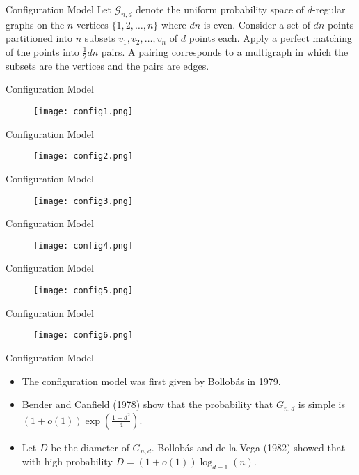 \documentclass{beamer}
\begin{document}
\begin{frame}{Configuration Model}
Let $\mathcal{G}_{n,d}$ denote the uniform probability space of $d$-regular graphs on the $n$ vertices $\{1,2,\dots,n\}$ where $dn$ is even.  Consider a set of $dn$ points partitioned into $n$ subsets $v_1,v_2,\dots,v_n$ of $d$ points each.  Apply a perfect matching of the points into $\frac{1}{2}dn$ pairs.  A pairing corresponds to a multigraph in which the subsets are the vertices and the pairs are edges.
\end{frame}

\begin{frame}{Configuration Model}
\begin{figure}[hbt]
\texttt{[image: config1.png]}
\end{figure}
\end{frame}

\begin{frame}{Configuration Model}
\begin{figure}[hbt]
\texttt{[image: config2.png]}
\end{figure}
\end{frame}

\begin{frame}{Configuration Model}
\begin{figure}[hbt]
\texttt{[image: config3.png]}
\end{figure}
\end{frame}

\begin{frame}{Configuration Model}
\begin{figure}[hbt]
\texttt{[image: config4.png]}
\end{figure}
\end{frame}

\begin{frame}{Configuration Model}
\begin{figure}[hbt]
\texttt{[image: config5.png]}
\end{figure}
\end{frame}

\begin{frame}{Configuration Model}
\begin{figure}[hbt]
\texttt{[image: config6.png]}
\end{figure}
\end{frame}

\begin{frame}{Configuration Model}
\begin{itemize}
\item The configuration model was first given by Bollob\'as in 1979.
\item Bender and Canfield (1978) show that the probability that $G_{n,d}$ is simple is $(1+o(1))\exp(\frac{1-d^2}{4})$.
\item Let $D$ be the diameter of $G_{n,d}$.  Bollob\'as and de la Vega (1982) showed that with high probability $D=(1+o(1))\log_{d-1}(n)$.
\end{itemize}
\end{frame}
\end{document}
